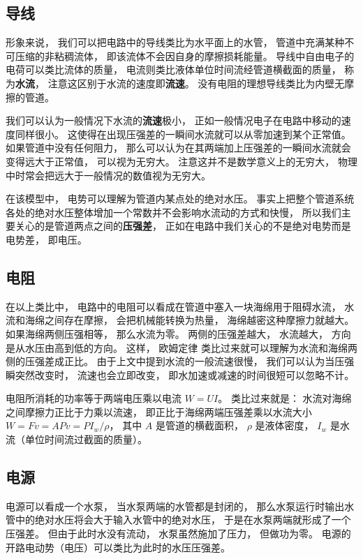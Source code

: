 
\subsection{导线}
形象来说， 我们可以把电路中的导线类比为水平面上的水管， 管道中充满某种不可压缩的非粘稠流体， 即该流体不会因自身的摩擦损耗能量。 导线中自由电子的电荷可以类比流体的质量， 电流则类比液体单位时间流经管道横截面的质量， 称为\textbf{水流}， 注意这区别于水流的速度即\textbf{流速}。 没有电阻的理想导线类比为内壁无摩擦的管道。

我们可以认为一般情况下水流的\textbf{流速}极小， 正如一般情况电子在电路中移动的速度同样很小。 这使得在出现压强差的一瞬间水流就可以从零加速到某个正常值。 如果管道中没有任何阻力， 那么可以认为在其两端加上压强差的一瞬间水流就会变得远大于正常值， 可以视为无穷大。 注意这并不是数学意义上的无穷大， 物理中时常会把远大于一般情况的数值视为无穷大。

在该模型中， 电势可以理解为管道内某点处的绝对水压。 事实上把整个管道系统各处的绝对水压整体增加一个常数并不会影响水流动的方式和快慢， 所以我们主要关心的是管道两点之间的\textbf{压强差}， 正如在电路中我们关心的不是绝对电势而是电势差， 即电压。

\subsection{电阻}
在以上类比中， 电路中的电阻可以看成在管道中塞入一块海绵用于阻碍水流， 水流和海绵之间存在摩擦， 会把机械能转换为热量， 海绵越密这种摩擦力就越大。 如果海绵两侧压强相等， 那么水流为零。 两侧的压强差越大， 水流越大， 方向是从水压由高到低的方向。 这样， 欧姆定律 类比过来就可以理解为水流和海绵两侧的压强差成正比。 由于上文中提到水流的一般流速很慢， 我们可以认为当压强瞬突然改变时， 流速也会立即改变， 即水加速或减速的时间很短可以忽略不计。

电阻所消耗的功率等于两端电压乘以电流 $W = UI$。 类比过来就是： 水流对海绵之间摩擦力正比于力乘以流速， 即正比于海绵两端压强差乘以水流大小 $W = F v = APv = PI_w/\rho$， 其中 $A$ 是管道的横截面积， $\rho$ 是液体密度， $I_w$ 是水流（单位时间流过截面的质量）。

\subsection{电源}
电源可以看成一个水泵， 当水泵两端的水管都是封闭的， 那么水泵运行时输出水管中的绝对水压将会大于输入水管中的绝对水压， 于是在水泵两端就形成了一个压强差。 但由于此时水没有流动， 水泵虽然施加了压力， 但做功为零。 电源的开路电动势（电压）可以类比为此时的水压压强差。

